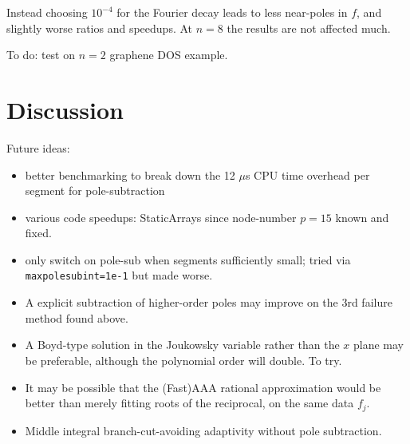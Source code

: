 \documentclass[11pt]{article}
\newcommand{\bi}{\begin{itemize}}
\newcommand{\ei}{\end{itemize}}
\begin{document}
Instead choosing $10^{-4}$ for the Fourier decay leads to less near-poles in $f$,
and slightly worse ratios and speedups. At $n=8$ the results are not affected much.

To do: test on $n=2$ graphene DOS example.



\section{Discussion}


Future ideas:
\bi
\item better benchmarking to break down the 12 $\mu$s
  CPU time overhead per segment for pole-subtraction
\item various code speedups: StaticArrays since node-number $p=15$ known and fixed.
\item only switch on pole-sub when segments sufficiently small; tried via {\tt maxpolesubint=1e-1} but made worse.
\item A explicit subtraction of higher-order poles may improve on the 3rd
  failure method found above.
\item A Boyd-type solution in the Joukowsky variable rather than the $x$ plane
  may be preferable, although the polynomial order will double. To try.
\item It may be possible that the (Fast)AAA rational approximation would be
  better than merely fitting roots of the reciprocal, on the same data $f_j$.
\item Middle integral branch-cut-avoiding adaptivity without pole subtraction.
\ei



\end{document}
